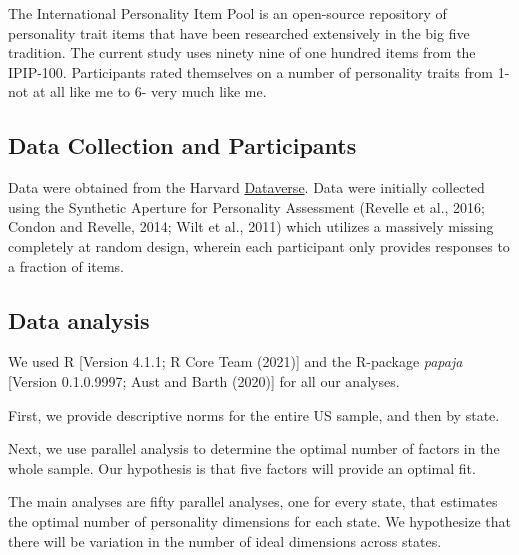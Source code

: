 \documentclass[
  english,
  man]{apa6}
\begin{document}
The International Personality Item Pool is an open-source repository of personality trait items that have been researched extensively in the big five tradition. The current study uses ninety nine of one hundred items from the IPIP-100. Participants rated themselves on a number of personality traits from 1- not at all like me to 6- very much like me.

\hypertarget{data-collection-and-participants}{%
\subsection{Data Collection and Participants}\label{data-collection-and-participants}}

Data were obtained from the Harvard \href{https://dataverse.harvard.edu/dataverse/SAPA-Project}{Dataverse}. Data were initially collected using the Synthetic Aperture for Personality Assessment (Revelle et al., 2016; Condon and Revelle, 2014; Wilt et al., 2011) which utilizes a massively missing completely at random design, wherein each participant only provides responses to a fraction of items.

\hypertarget{data-analysis}{%
\subsection{Data analysis}\label{data-analysis}}

We used R {[}Version 4.1.1; R Core Team (2021){]} and the R-package \emph{papaja} {[}Version 0.1.0.9997; Aust and Barth (2020){]} for all our analyses.

First, we provide descriptive norms for the entire US sample, and then by state.

Next, we use parallel analysis to determine the optimal number of factors in the whole sample. Our hypothesis is that five factors will provide an optimal fit.

The main analyses are fifty parallel analyses, one for every state, that estimates the optimal number of personality dimensions for each state. We hypothesize that there will be variation in the number of ideal dimensions across states.
\end{document}
